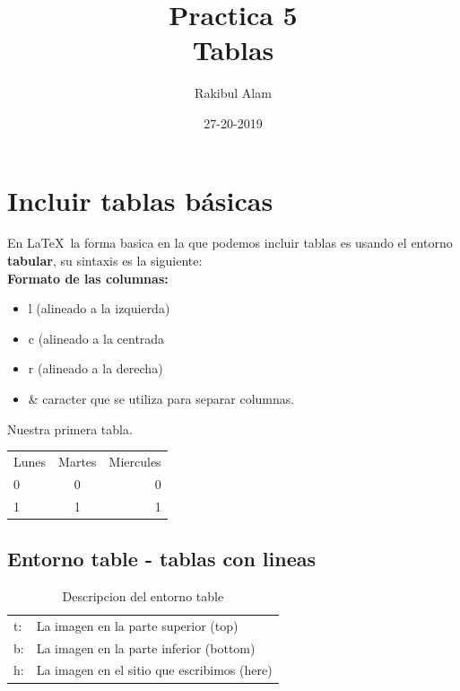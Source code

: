 \documentclass[12pt]{article}
\begin{document}
\title{Practica 5\\Tablas}
\author{Rakibul Alam}
\date{27-20-2019}
\maketitle
\tableofcontents


\section{Incluir tablas básicas}
En \LaTeX \, la forma basica en la que podemos incluir tablas es usando el entorno \textbf{tabular}, su sintaxis es la siguiente:\\[0.3cm]
\noindent \textbf{Formato de las columnas:}
\begin{itemize}
\item l (alineado a la izquierda)
\item c (alineado a la centrada
\item r (alineado a la derecha)
\end{itemize}

\begin{itemize}
\item $\& $ caracter que se utiliza para separar columnas.
\end{itemize}

Nuestra primera tabla. \quad
\begin{tabular}{lcr}
Lunes & Martes & Miercules \\
0 	  &		 0 & 	0\\
1	  &     1  & 1  \\
\end{tabular}

\newpage

\subsection{Entorno table - tablas con lineas}

\begin{table}[!ht]
\centering

\begin{tabular}{ll}
t: & La imagen en la parte superior (top)\\
b: & La imagen en la parte inferior (bottom)\\
h: & La imagen en el sitio que escribimos (here)
\end{tabular}
\caption{Descripcion del entorno table}
\label{Tabla1}
\end{table}
\end{document}
